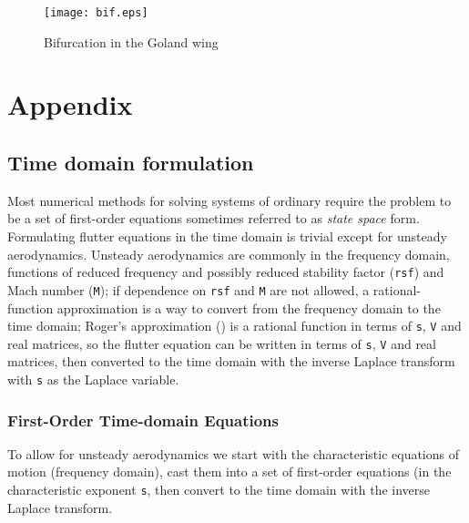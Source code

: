 \documentclass[11pt,openany,twoside]{book}
\numberwithin{equation}{section}		%
\newcommand{\Newterm}[1]{{\em #1}}
\newcommand{\Code}[1]{{\small\tt #1}}
\begin{document}
\begin{figure}[h!]
		\texttt{[image: bif.eps]}
	\centering
	\caption{Bifurcation in the Goland wing}\label{fig:bifurcation}
\end{figure}

\newpage
\chapter{Appendix}\label{chap:appendices}

\section{Time domain formulation}\label{sect:timedomain}
Most numerical methods for solving systems of ordinary require the
problem to be a set of first-order equations
sometimes referred to as \Newterm{state space} form.
Formulating flutter equations in the time domain is trivial except for unsteady
aerodynamics. Unsteady aerodynamics are commonly in the frequency domain,
functions of reduced frequency and possibly reduced stability factor (\Code{rsf}) and
Mach number (\Code{M}); if dependence on \Code{rsf} and \Code{M} are not allowed,
a rational-function approximation is a way to convert from the frequency domain to the
time domain; Roger's approximation (\cite{roger1977airplane}) is a rational function
in terms of \Code{s}, \Code{V} and real matrices, so the flutter equation can
be written in terms of \Code{s}, \Code{V} and real matrices, then converted
to the time domain with the inverse Laplace transform with \Code{s} as the Laplace
variable.

\subsection{First-Order Time-domain Equations}\label{sect:statespace}
To allow for unsteady aerodynamics
we start with the characteristic equations of motion
(frequency domain), cast them into a set of first-order equations
(in the characteristic exponent \Code{s}, then convert to the time domain with the inverse
Laplace transform.
\end{document}
